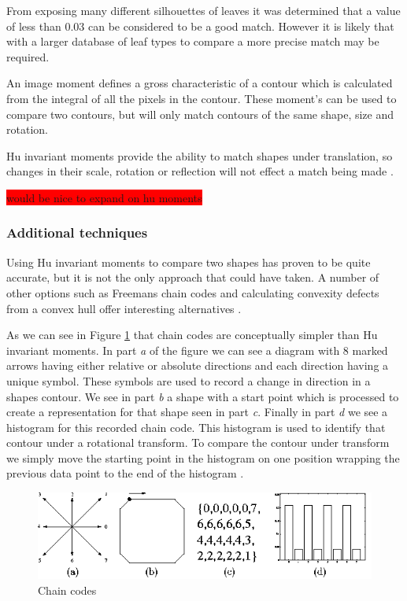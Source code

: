 From exposing many different silhouettes of leaves it was determined that a value of less than 0.03 can be considered to be a good match. However it is likely that with a larger database of leaf types to compare a more precise match may be required.

An image moment defines a gross characteristic of a contour which is calculated from the integral of all the pixels in the contour. These moment’s can be used to compare two contours, but will only match contours of the same shape, size and rotation.

Hu invariant moments provide the ability to match shapes under translation, so changes in their scale, rotation or reflection will not effect a match being made \cite{shutler02, rizon06}.

\colorbox{red}{would be nice to expand on hu moments}

\subsubsection{Additional techniques}
Using Hu invariant moments to compare two shapes has proven to be quite accurate, but it is not the only approach that could have taken. A number of other options such as Freemans chain codes and calculating convexity defects from a convex hull offer interesting alternatives \cite{park05, iivarinen97}. 

As we can see in Figure \ref{chain_codes} that chain codes are conceptually simpler than Hu invariant moments. In part \emph{a} of the figure we can see a diagram with 8 marked arrows having either relative or absolute directions and each direction having a unique symbol. These symbols are used to record a change in direction in a shapes contour. We see in part \emph{b} a shape with a start point which is processed to create a representation for that shape seen in part \emph{c}. Finally in part \emph{d} we see a histogram for this recorded chain code. This histogram is used to identify that contour under a rotational transform. To compare the contour under transform we simply move the starting point in the histogram on one position wrapping the previous data point to the end of the histogram \cite{anderson06}.

\begin{figure}[h!]
\centering
    \includegraphics[width=.7\textwidth]{leaf_identification/images/chain_codes.png}
    \caption{Chain codes}%
    \label{chain_codes}
\end{figure}

